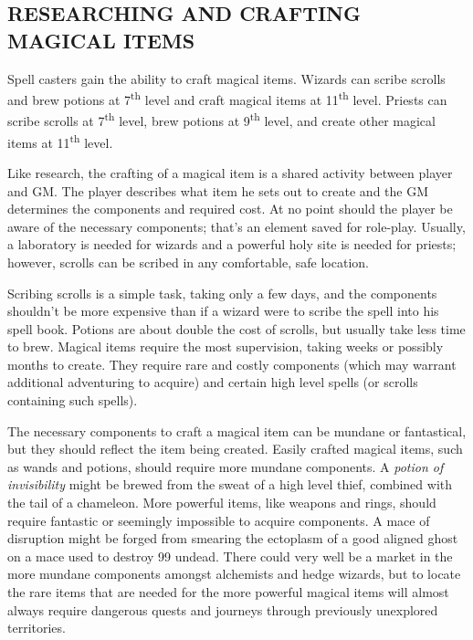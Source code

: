 \begin{multicols}{2}
\subsection{RESEARCHING AND CRAFTING MAGICAL ITEMS}

Spell casters gain the ability to craft magical items.  Wizards can scribe scrolls and brew potions at 7\textsuperscript{th} level and craft magical items at 11\textsuperscript{th} level.  Priests can scribe scrolls at 7\textsuperscript{th} level, brew potions at 9\textsuperscript{th} level, and create other magical items at 11\textsuperscript{th} level. 
 
Like research, the crafting of a magical item is a shared activity between player and GM.  The player describes what item he sets out to create and the GM determines the components and required cost.  At no point should the player be aware of the necessary components; that's an element saved for role-play.  Usually, a laboratory is needed for wizards and a powerful holy site is needed for priests; however, scrolls can be scribed in any comfortable, safe location. 
 
Scribing scrolls is a simple task, taking only a few days, and the components shouldn't be more expensive than if a wizard were to scribe the spell into his spell book.  Potions are about double the cost of scrolls, but usually take less time to brew.  Magical items require the most supervision, taking weeks or possibly months to create. They require rare and costly components (which may warrant additional adventuring to acquire) and certain high level spells (or scrolls containing such spells).
 
The necessary components to craft a magical item can be mundane or fantastical, but they should reflect the item being created.  Easily crafted magical items, such as wands and potions, should require more mundane components.  A \textit{potion of invisibility} might be brewed from the sweat of a high level thief, combined with the tail of a chameleon.  More powerful items, like weapons and rings, should require fantastic or seemingly impossible to acquire components.  A mace of disruption might be forged from smearing the ectoplasm of a good aligned ghost on a mace used to destroy 99 undead.  There could very well be a market in the more mundane components amongst alchemists and hedge wizards, but to locate the rare items that are needed for the more powerful magical items will almost always require dangerous quests and journeys through previously unexplored territories.
 

\end{multicols}
